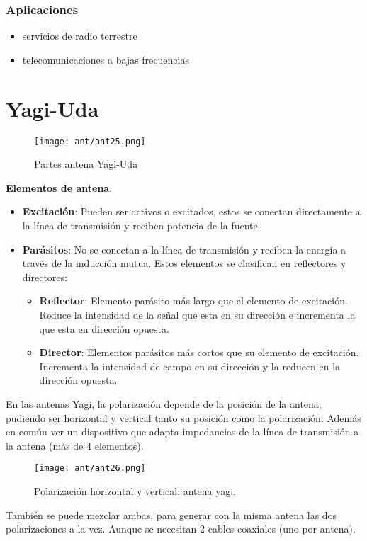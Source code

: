 \documentclass[
	12pt, %
	fleqn, %
	a4paper, %
	oneside, %
]{LegrandOrangeBook}
\begin{document}
\subsubsection{Aplicaciones}
\begin{itemize}
\item servicios de radio terrestre
\item telecomunicaciones a bajas frecuencias
\end{itemize}
\section{Yagi-Uda}
\begin{figure}[H]
\centering
\texttt{[image: ant/ant25.png]}
\caption{Partes antena Yagi-Uda}
\end{figure}
\textbf{Elementos de antena}:
\begin{itemize}
\item \textbf{Excitación}: Pueden ser activos o excitados, estos se conectan directamente a la línea de transmisión y reciben potencia de la fuente.
\item \textbf{Parásitos}: No se conectan a la línea de transmisión y reciben la energía a través de la inducción mutua. Estos elementos se clasifican en reflectores y directores:
\begin{itemize}
\item \textbf{Reflector}: Elemento parásito más largo que el elemento de excitación. Reduce la intensidad de la señal que esta en su dirección e incrementa la que esta en dirección opuesta.
\item \textbf{Director}: Elementos parásitos más cortos que su elemento de excitación. Incrementa la intensidad de campo en su dirección y la reducen en la dirección opuesta.
\end{itemize}
\end{itemize}
En las antenas Yagi, la polarización depende de la posición de la antena, pudiendo ser horizontal y vertical tanto su posición como la polarización. Además en común ver un dispositivo que adapta impedancias de la línea de transmisión a la antena (más de 4 elementos).
\begin{figure}[H]
\centering
\texttt{[image: ant/ant26.png]}
\caption{Polarización horizontal y vertical: antena yagi.}
\end{figure}
También se puede mezclar ambas, para generar con la misma antena las dos polarizaciones a la vez. Aunque se necesitan 2 cables coaxiales (uno por antena).\\
\end{document}
